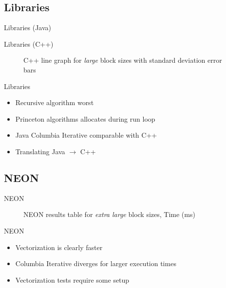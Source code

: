\documentclass[xcolor={table}]{beamer}
\begin{document}
\subsection{Libraries}
\begin{frame}{Libraries (Java)}
    \begin{table}
        \centering
        
        \caption{Java line graph for \emph{large} block sizes with standard deviation error bars}
    \end{table}
\end{frame}
\begin{frame}{Libraries (C++)}
    \begin{figure}
        \centering
        
        \caption{C++ line graph for \emph{large} block sizes with standard deviation error bars}
    \end{figure}
\end{frame}
\begin{frame}{Libraries}
    \begin{itemize}
        \item Recursive algorithm worst
        \item Princeton algorithms allocates during run loop
        \item Java Columbia Iterative comparable with C++
        \item Translating Java $\rightarrow$ C++
    \end{itemize}
\end{frame}

\subsection{NEON}
\begin{frame}{NEON}
    \begin{figure}
        \centering
        
        \caption{NEON results table for \emph{extra large} block sizes, Time (ms)}
    \end{figure}
\end{frame}

\begin{frame}{NEON}
    \begin{itemize}
        \item Vectorization is clearly faster 
        \item Columbia Iterative diverges for larger execution times
        \item Vectorization tests require some setup
    \end{itemize}
\end{frame}
\end{document}
